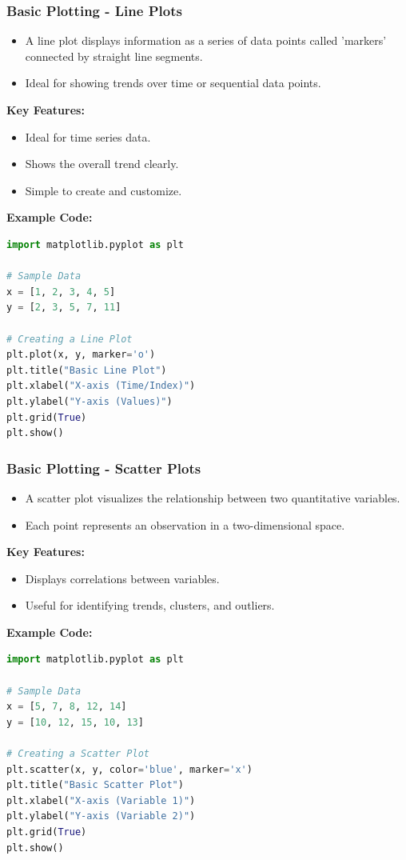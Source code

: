 \documentclass{beamer}
\begin{document}
\begin{frame}
    \frametitle{Basic Plotting - Line Plots}
    \begin{itemize}
        \item A line plot displays information as a series of data points called 'markers' connected by straight line segments.
        \item Ideal for showing trends over time or sequential data points.
    \end{itemize}
    
    \textbf{Key Features:}
    \begin{itemize}
        \item Ideal for time series data.
        \item Shows the overall trend clearly.
        \item Simple to create and customize.
    \end{itemize}
    
    \textbf{Example Code:}
    \begin{lstlisting}[language=Python]
import matplotlib.pyplot as plt

# Sample Data
x = [1, 2, 3, 4, 5]
y = [2, 3, 5, 7, 11]

# Creating a Line Plot
plt.plot(x, y, marker='o')
plt.title("Basic Line Plot")
plt.xlabel("X-axis (Time/Index)")
plt.ylabel("Y-axis (Values)")
plt.grid(True)
plt.show()
    \end{lstlisting}
\end{frame}

\begin{frame}
    \frametitle{Basic Plotting - Scatter Plots}
    \begin{itemize}
        \item A scatter plot visualizes the relationship between two quantitative variables.
        \item Each point represents an observation in a two-dimensional space.
    \end{itemize}
    
    \textbf{Key Features:}
    \begin{itemize}
        \item Displays correlations between variables.
        \item Useful for identifying trends, clusters, and outliers.
    \end{itemize}
    
    \textbf{Example Code:}
    \begin{lstlisting}[language=Python]
import matplotlib.pyplot as plt

# Sample Data
x = [5, 7, 8, 12, 14]
y = [10, 12, 15, 10, 13]

# Creating a Scatter Plot
plt.scatter(x, y, color='blue', marker='x')
plt.title("Basic Scatter Plot")
plt.xlabel("X-axis (Variable 1)")
plt.ylabel("Y-axis (Variable 2)")
plt.grid(True)
plt.show()
    \end{lstlisting}
\end{frame}
\end{document}
